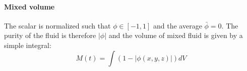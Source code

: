 \paragraph{Mixed volume}

The scalar is normalized such that $\phi \in \left[-1, 1\right]$ and the average $\bar\phi = 0$.
The purity of the fluid is therefore $\left| \phi \right|$ and the volume of mixed fluid is given by a simple integral:
\begin{equation}
M(t) = \int \left( 1 - \left| \phi(x,y,z) \right|\right) dV
\end{equation}

